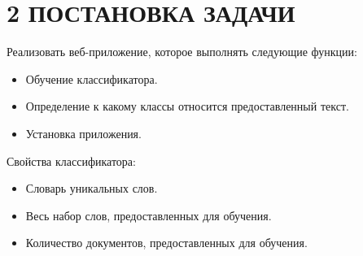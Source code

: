 \documentclass[14pt,a4paper]{extreport}
\begin{document}
	\section*{\normalsize\hspace{4ex}2 ПОСТАНОВКА ЗАДАЧИ}
	 \par Реализовать веб-приложение, которое выполнять следующие функции:
    \begin{itemize}
      \item Обучение классификатора.
      \item Определение к какому классы относится предоставленный текст.
      \item Установка приложения.
    \end{itemize}
    \par Свойства классификатора:
    \begin{itemize}
      \item Словарь уникальных слов.
      \item Весь набор слов, предоставленных для обучения.
      \item Количество документов, предоставленных для обучения.
    \end{itemize}
    \newpage

	\newpage
\end{document}
